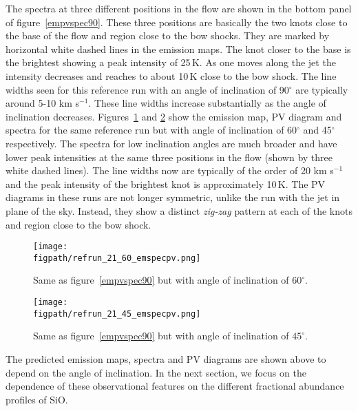 \documentclass[useAMS,usenatbib]{mn2e}
\newcommand{\figpath}{/Users/bhargavvaidya/MyProject/work/Leeds_Uni/SiOJets_New/PAPER/PFIGS/}
\begin{document}
The spectra at three different positions in the flow are shown in the
bottom panel of figure~\ref{empvspec90}. These three positions are
basically the two knots close to the base of the flow and region close
to the bow shocks. They are marked by horizontal white dashed lines in
the emission maps. The knot closer to the base is the brightest
showing a peak intensity of 25\,K. As one moves along the jet the
intensity decreases and reaches to about 10\,K close to the bow shock.
The line widths seen for this reference run with an angle of
inclination of 90$^{\circ}$ are typically around 5-10 km s$^{-1}$.
These line widths increase substantially as the angle of inclination
decreases. Figures~\ref{empvspec60} and \ref{empvspec45} show the
emission map, PV diagram and spectra for the same reference run but
with angle of inclination of 60$^{\circ}$ and 45$^{\circ}$
respectively. The spectra for low inclination angles are much broader
and have lower peak intensities at the same three positions in the flow (shown by
three white dashed lines). The line 
widths now are typically of the order of 20 km s$^{-1}$ and the peak
intensity of the brightest knot is approximately 10\,K. 
The PV diagrams in these runs are not longer symmetric, unlike the run
with the jet in plane of the sky. Instead, they show a distinct {\it zig-zag}
pattern at each of the knots and region close to the bow shock.


\begin{figure}
 \texttt{[image: \\figpath/refrun\_21\_60\_emspecpv.png]}
 \caption{Same as figure~\ref{empvspec90} but with angle of
   inclination of $60^{\circ}$.} 
\label{empvspec60}
\end{figure}

\begin{figure}
 \texttt{[image: \\figpath/refrun\_21\_45\_emspecpv.png]}
 \caption{Same as figure~\ref{empvspec90} but with angle of
   inclination of $45^{\circ}$.} 
\label{empvspec45}
\end{figure}

%
The predicted emission maps, spectra and PV diagrams are shown above to depend
on the angle of inclination. In the next section, we focus on the
dependence of these observational features on the 
different fractional abundance profiles of SiO.
\end{document}
